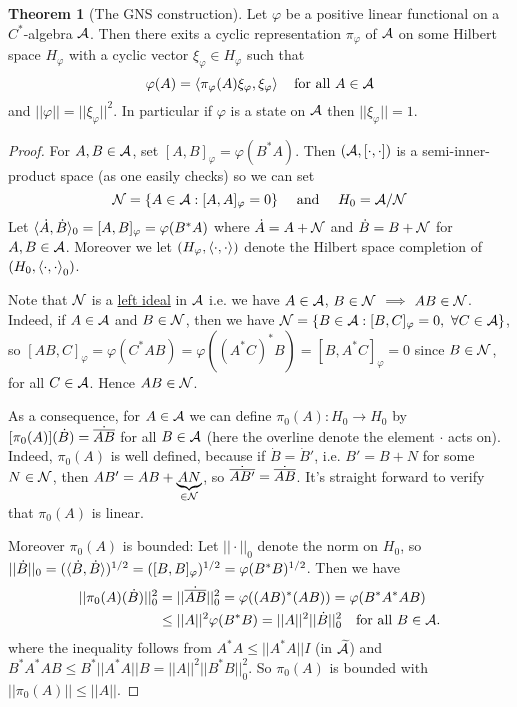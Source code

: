 \documentclass[10pt,english,a4paper]{article}
\theoremstyle{definition}
\newtheorem*{theorem}{Theorem}
\def\tAs{\widetilde{\As}}
\def\dA{\dot{A}}
\def\dB{\dot{B}}
\def\dA{\dot{A}}
\def\dB{\dot{B}}
\def\vphi{\varphi}
\begin{document}
\begin{theorem}[The GNS construction]
    Let $\vphi$ be a positive linear functional on a $C^*$-algebra $\mathcal{A}$. Then 
there exits a cyclic representation $\pi_{\vphi}$ of $\mathcal{A}$ on some Hilbert space 
$H_{\vphi}$ with a cyclic vector $\xi_{\vphi} \in H_{\vphi}$ such that 
\[ \vphi(A) = \ind{\pi_{\vphi}(A)\xi_{\vphi},\xi_{\vphi}}\quad \text{for all }
A \in \As \]
and $||\vphi|| = ||\xi_{\vphi}||^2$. In particular if $\vphi$ is a state on $\mathcal{A}$
then $|| \xi_{\vphi} || = 1$.
\end{theorem}
\begin{proof}
    For $A,B \in \mathcal{A}$, set $[A,B]_{\vphi} = \vphi(B^*A)$. Then 
$(\mathcal{A},[\cdot,\cdot])$ is a semi-inner-product space (as one easily checks) 
so we can set 
\[ \Ns = \{ A \in \As : [A,A]_{\vphi} = 0 \} \quad \text{ and } \quad 
H_0 = \As /\Ns\]
Let $\indi{\dA,\dB}_0 = [A,B]_{\vphi} = \vphi(B^*A)$ where 
$\dA = A + \Ns$ and $\dB = B  + \Ns$ for $A,B \in \mathcal{A}$.
Moreover we let $(H_{\vphi}, \ind{\cdot,\cdot})$ denote the Hilbert space completion
of $(H_0, \left\langle \cdot,\cdot \right\rangle_0)$. 

Note that $\mathcal{N}$ is a \ul{left ideal} in $\mathcal{A}$
i.e. we have $A \in \mathcal{A}$, $B \in \mathcal{N}$ $\implies$ $AB \in \mathcal{N}$.
Indeed, if $A \in \mathcal{A}$ and $B \in \mathcal{N}$, then we have 
$\Ns = \{ B \in \As : [B,C]_{\vphi}= 0, ~\forall C \in \As\}$, so
$[AB,C]_{\vphi} = \vphi(C^*AB) = \vphi((A^*C)^*B) = [B,A^*C]_{\vphi} = 0$ since $B\in \mathcal{N}$, 
for all $C \in \mathcal{A}$. Hence $AB \in \mathcal{N}$.

As a consequence, for $A \in \mathcal{A}$ we can define $\pi_{0}(A)\colon H_0 \to H_0$
by $[\pi_0(A)](\dB) = \dot{\ol{AB}}$ for all $B \in \mathcal{A}$ (here the overline denote the 
element $\cdot$ acts on).
Indeed, $\pi_0(A)$ is well defined, because 
if $\dB = \dB'$, i.e. $B' = B + N$ for some $N \in \mathcal{N}$, then
$AB' = AB + \underbrace{AN}_{\in \mathcal{N}}$, so $\dot{\overline{AB'}} = \dot{\overline{AB}}$.
It's straight forward to verify that $\pi_0(A)$ is linear.

Moreover $\pi_0(A)$ is bounded:
Let $||\cdot||_0$ denote the norm on $H_0$, so 
$||\dB||_0 = (\indi{\dB, \dB})^{1/2} = ([B,B]_{\vphi})^{1/2} =
\vphi(B^*B)^{1/2}$. 
Then we have
\begin{align*}
    ||\pi_0(A)(\dB)||_{0}^{2} &= ||\dot{\ol{AB}}||_{0}^{2} = \vphi((AB)^*(AB)) 
   = \vphi(B^*A^*AB) \\
    &\leq ||A||^2\vphi(B^*B) = ||A||^2 ||\dot{B}||_{0}^{2} \quad \text{for all
    } B \in \As.
\end{align*}
where the inequality follows from $A^*A \leq ||A^*A|| I$ (in $\tAs$) and 
$B^*A^*AB \leq B^*||A^*A||B = ||A||^2 ||B^*B||_{0}^{2}$.
So $\pi_0(A)$ is bounded with $||\pi_0(A)|| \leq ||A||$. 


\end{proof}
\end{document}
